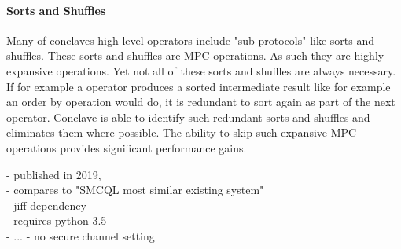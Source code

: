 \paragraph{Sorts and Shuffles}
Many of conclaves high-level operators include "sub-protocols" like sorts and shuffles. These sorts and shuffles are MPC operations. As such they are highly expansive operations. Yet not all of these sorts and shuffles are always necessary. If for example a operator produces a sorted intermediate result like for example an order by operation would do, it is redundant to sort again as part of the next operator. Conclave is able to identify such redundant sorts and shuffles and eliminates them where possible. The ability to skip such expansive MPC operations provides significant performance gains.




- published in 2019,\\
- compares to "SMCQL most similar existing system"\\
- jiff dependency \\
- requires python 3.5 \\
- ... 
- no secure channel setting\\